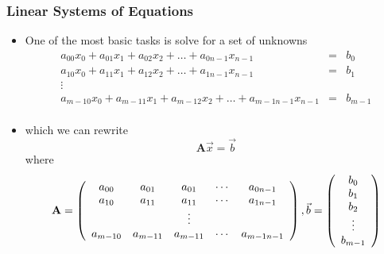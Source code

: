 \documentclass[10pt]{beamer}
\begin{document}
\begin{frame}
  \frametitle{Linear Systems of Equations}
  \begin{itemize}
  \item One of the most basic tasks is solve for a set of unknowns
    \[
      \begin{array}{ccc}
        a_{00} x_0 + a_{01} x_1 + a_{02} x_2 + \ldots + a_{0n-1} x_{n-1} & = & b_0\\
        a_{10} x_0 + a_{11} x_1 + a_{12} x_2 + \ldots + a_{1n-1} x_{n-1} & = & b_1\\
        \vdots && \\
        a_{m-10} x_0 + a_{m-11} x_1 + a_{m-12} x_2 + \ldots + a_{m-1n-1} x_{n-1} & = & b_{m-1}\\
      \end{array}
    \]
    \pause
  \item which we can rewrite
    \[
      \mathbf{A} \vec{x} = \vec{b}
    \]
    where
    \[
      \mathbf{A} = \left(
        \begin{array}{ccccc}
          a_{00} & a_{01} & a_{01} & \cdots & a_{0n-1} \\
          a_{10} & a_{11} & a_{11} & \cdots & a_{1n-1} \\
          & &  \vdots & & \\
          a_{m-10} & a_{m-11} & a_{m-11} & \cdots & a_{m-1n-1} \\
        \end{array}\right), 
      \vspace{1cm} 
      \vec{b} = \left(
        \begin{array}{c}
          b_0 \\ b_1 \\ b_2 \\ \vdots \\ b_{m-1} \\
        \end{array}\right)
    \]
  \end{itemize}
\end{frame}
\end{document}
